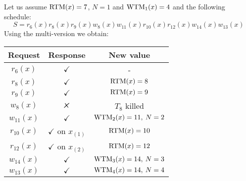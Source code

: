 \begin{example}
    Let us assume $\textnormal{RTM}(x)=7$, $N=1$ and $\textnormal{WTM}_1(x)=4$ and the following schedule: 
    \[S=r_6(x) r_8(x) r_9(x) w_8(x) w_{11}(x) r_{10}(x) r_{12}(x) w_{14}(x) w_{13}(x)\]
    Using the multi-version we obtain: 
    \begin{table}[H]
        \centering
        \begin{tabular}{ccc}
        \textbf{Request} & \textbf{Response}         & \textbf{New value}  \\ \hline
        $r_6(x)$         & $\checkmark$              & -                   \\
        $r_8(x)$         & $\checkmark$              & $\textnormal{RTM}(x)=8$          \\
        $r_9(x)$         & $\checkmark$              & $\textnormal{RTM}(x)=9$          \\
        $w_8(x)$         & $\tikzxmark$              & $T_8$ killed        \\
        $w_{11}(x)$      & $\checkmark$              & $\textnormal{WTM}_2(x)=11,\:N=2$ \\
        $r_{10}(x)$      & $\checkmark$ on $x_{(1)}$ & $\textnormal{RTM}(x)=10$         \\
        $r_{12}(x)$      & $\checkmark$ on $x_{(2)}$ & $\textnormal{RTM}(x)=12$         \\
        $w_{14}(x)$      & $\checkmark$              & $\textnormal{WTM}_3(x)=14,\:N=3$ \\
        $w_{13}(x)$      & $\checkmark$              & $\textnormal{WTM}_4(x)=14,\:N=4$
        \end{tabular}
    \end{table}
\end{example}

